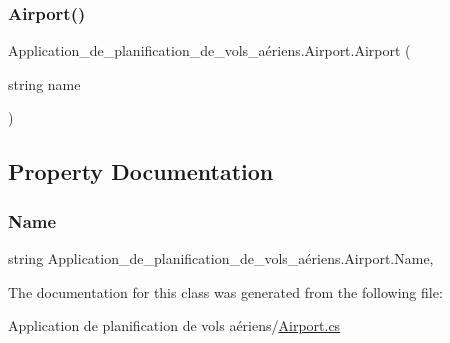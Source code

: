 \subsubsection{\texorpdfstring{Airport()}{Airport()}}
{\footnotesize\ttfamily Application\+\_\+de\+\_\+planification\+\_\+de\+\_\+vols\+\_\+aériens.\+Airport.\+Airport (\begin{DoxyParamCaption}\item[{string}]{name }\end{DoxyParamCaption})}



\subsection{Property Documentation}
\mbox{\label{class_application__de__planification__de__vols__a_xC3_xA9riens_1_1_airport_a25b8937bd4f555b7597bd2ac771da73d}} 
\subsubsection{\texorpdfstring{Name}{Name}}
{\footnotesize\ttfamily string Application\+\_\+de\+\_\+planification\+\_\+de\+\_\+vols\+\_\+aériens.\+Airport.\+Name\hspace{0.3cm}{\ttfamily [get]}, {\ttfamily [set]}}



The documentation for this class was generated from the following file\+:\begin{DoxyCompactItemize}
\item 
Application de planification de vols aériens/\hyperlink{_airport_8cs}{Airport.\+cs}\end{DoxyCompactItemize}
